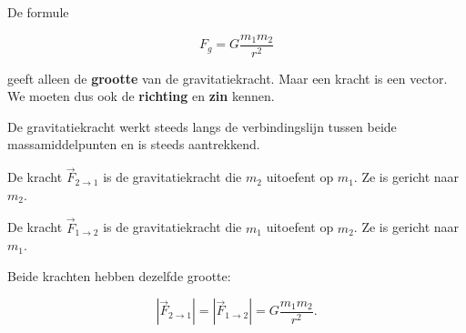 \documentclass{ximera}
\begin{document}


De formule

\[
F_g=G\frac{m_1m_2}{r^2}
\]

geeft alleen de \textbf{grootte} van de gravitatiekracht.
Maar een kracht is een vector. We moeten dus ook de
\textbf{richting} en \textbf{zin} kennen.

De gravitatiekracht werkt steeds langs de verbindingslijn tussen beide
massamiddelpunten en is steeds aantrekkend.

\begin{center}
\end{center}

De kracht $\vec F_{2\to1}$ is de gravitatiekracht die $m_2$
uitoefent op $m_1$. Ze is gericht naar $m_2$.

De kracht $\vec F_{1\to2}$ is de gravitatiekracht die $m_1$
uitoefent op $m_2$. Ze is gericht naar $m_1$.

Beide krachten hebben dezelfde grootte:

\[
\left|\vec F_{2\to1}\right|
=
\left|\vec F_{1\to2}\right|
=
G\frac{m_1m_2}{r^2}.
\]
\end{document}
